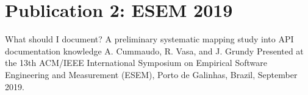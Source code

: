 \chapter{Publication 2: ESEM 2019}

{What should I document? A preliminary systematic mapping study into API documentation knowledge}
{A. Cummaudo, R. Vasa, and J. Grundy}
{Presented at the 13th ACM/IEEE International Symposium on Empirical Software Engineering and Measurement (ESEM), Porto de Galinhas, Brazil, September 2019.}

